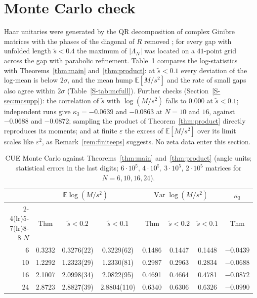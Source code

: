 \documentclass[12pt]{amsart}
\theoremstyle{remark}
\newcommand{\E}{\mathbb{E}}
\newcommand{\eps}{\varepsilon}
\newcommand{\1}{\mathbf{1}}
\DeclareMathOperator{\Var}{Var}
\begin{document}
\section{Monte Carlo check}\label{sec:mc}

Haar unitaries were generated by the QR decomposition of complex Ginibre
matrices with the phases of the diagonal of $R$ removed \cite{Mez07}; for every gap with unfolded length $\tilde s<0.4$
the maximum of $|\Lambda_N|$ was located on a $41$-point grid across the
gap with parabolic refinement. Table~\ref{tab:mc} compares the
log-statistics with Theorems~\ref{thm:main} and~\ref{thm:product}: at
$\tilde s<0.1$ every deviation of the log-mean is below $2\sigma$, and the
mean hump $\E[M/s^2]$ and the rate of small gaps also agree within $2\sigma$
(Table~\ref{S-tab:mcfull}). Further checks (Section~\ref{S-sec:mcsupp}):
the correlation of $\tilde s$ with $\log(M/s^2)$ falls to $0.000$ at
$\tilde s<0.1$; independent runs give $\kappa_3=-0.0639$ and $-0.0863$ at
$N=10$ and $16$, against $-0.0688$ and $-0.0872$; sampling the product of
Theorem~\ref{thm:product} directly reproduces its moments; and at finite
$\eps$ the excess of $\E[M/s^2]$ over its limit scales like $\eps^2$, as
Remark~\ref{rem:finiteeps} suggests. No zeta data enter this section.

\begin{table}[h]
\centering
\small
\begin{tabular}{rccccccc}
\toprule
& \multicolumn{3}{c}{$\E\log(M/s^2)$} & \multicolumn{3}{c}{$\Var\log(M/s^2)$} & $\kappa_3$\\
\cmidrule(lr){2-4}\cmidrule(lr){5-7}\cmidrule(lr){8-8}
$N$ & Thm & $\tilde s<0.2$ & $\tilde s<0.1$ & Thm & $\tilde s<0.2$ & $\tilde s<0.1$ & Thm\\
\midrule
6 & 0.3232 & 0.3276(22) & 0.3229(62) & 0.1486 & 0.1447 & 0.1448 & $-0.0439$\\
10 & 1.2292 & 1.2323(29) & 1.2330(81) & 0.2987 & 0.2963 & 0.2834 & $-0.0688$\\
16 & 2.1007 & 2.0998(34) & 2.0822(95) & 0.4691 & 0.4664 & 0.4781 & $-0.0872$\\
24 & 2.8723 & 2.8827(39) & 2.8804(110) & 0.6340 & 0.6306 & 0.6326 & $-0.0990$\\
\bottomrule
\end{tabular}
\caption{\label{tab:mc}CUE Monte Carlo against Theorems~\ref{thm:main}
and~\ref{thm:product} (angle units; statistical errors in the last digits;
$6\cdot10^5$, $4\cdot10^5$, $3\cdot10^5$, $2\cdot10^5$ matrices for
$N=6,10,16,24$).}
\end{table}
\end{document}

